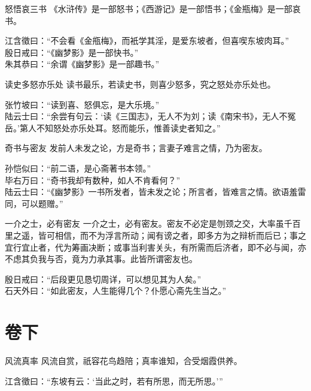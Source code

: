 \begin{yulu}{怒悟哀三书}
《水浒传》是一部怒书；《西游记》是一部悟书；《金瓶梅》是一部哀书。
\begin{comments}
江含徵曰：“不会看《金甁梅》，而衹学其淫，是爱东坡者，但喜喫东坡肉耳。” \\
殷日戒曰：“《幽梦影》是一部快书。” \\
朱其恭曰：“余谓《幽梦影》是一部趣书。”
\end{comments}
\end{yulu}

\begin{yulu}{读史多怒亦乐处}
读书最乐，若读史书，则喜少怒多，究之怒处亦乐处也。
\begin{comments}
张竹坡曰：“读到喜、怒俱忘，是大乐境。” \\
陆云士曰：“余尝有句云：‘读《三国志》，无人不为刘；读《南宋书》，无人不冤岳。’第人不知怒处亦乐处耳。怒而能乐，惟善读史者知之。”
\end{comments}
\end{yulu}

\begin{yulu}{奇书与密友}
发前人未发之论，方是奇书；言妻子难言之情，乃为密友。
\begin{comments}
孙恺似曰：“前二语，是心斋著书本领。” \\
毕右万曰：“奇书我却有数种，如人不肯看何？” \\
陆云士曰：“《幽梦影》一书所发者，皆未发之论；所言者，皆难言之情。欲语羞雷同，可以题赠。”
\end{comments}
\end{yulu}

\begin{yulu}{一介之士，必有密友}
一介之士，必有密友。密友不必定是刎颈之交，大率虽千百里之遥，皆可相信，而不为浮言所动；闻有谤之者，即多方为之辩析而后已；事之宜行宜止者，代为筹画决断；或事当利害关头，有所需而后济者，即不必与闻，亦不虑其负我与否，竟为力承其事。此皆所谓密友也。
\begin{comments}
殷日戒曰：“后段更见恳切周详，可以想见其为人矣。” \\
石天外曰：“如此密友，人生能得几个？仆愿心斋先生当之。”
\end{comments}
\end{yulu}


\chapter{卷下}

\begin{yulu}{风流真率}
风流自赏，祇容花鸟趋陪；真率谁知，合受烟霞供养。
\begin{comments}
江含徵曰：“东坡有云：‘当此之时，若有所思，而无所思。’”
\end{comments}
\end{yulu}


